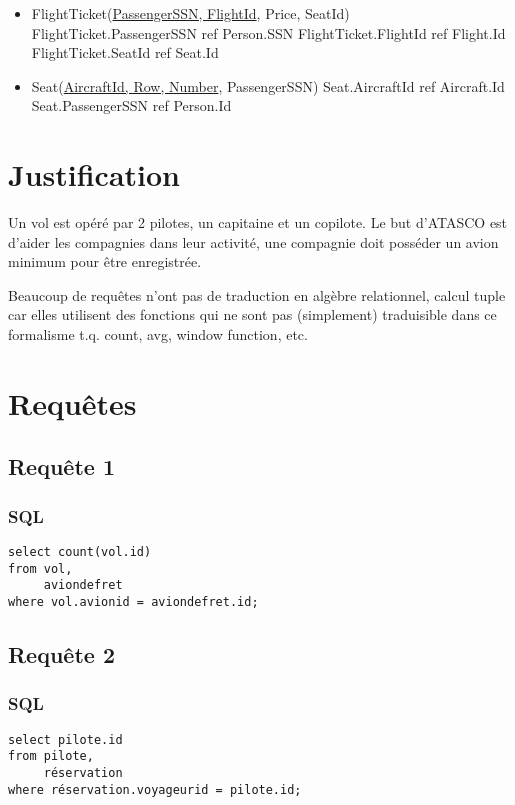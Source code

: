 \documentclass[french, utf8]{article}
\begin{document}
\begin{itemize}
    \item FlightTicket(\underline{PassengerSSN, FlightId}, Price, SeatId)
    \subitem FlightTicket.PassengerSSN ref Person.SSN
    \subitem FlightTicket.FlightId ref Flight.Id
    \subitem FlightTicket.SeatId ref Seat.Id
    \newline

    \item Seat(\underline{AircraftId, Row, Number}, PassengerSSN)
    \subitem Seat.AircraftId ref Aircraft.Id
    \subitem Seat.PassengerSSN ref Person.Id

\end{itemize}




\section{Justification}
Un vol est opéré par 2 pilotes, un capitaine et un copilote.
\newline
Le but d'ATASCO est d'aider les compagnies dans leur activité, une compagnie doit posséder un avion minimum pour être enregistrée.


Beaucoup de requêtes n'ont pas de traduction en algèbre relationnel, calcul tuple car elles utilisent des fonctions qui ne sont pas (simplement) traduisible dans ce formalisme t.q. count, avg, window function, etc.
\newpage

\section{Requêtes}
\subsection{Requête 1}
\subsubsection{SQL}
\begin{verbatim}
select count(vol.id)
from vol,
     aviondefret
where vol.avionid = aviondefret.id;
\end{verbatim}

\newpage

\subsection{Requête 2}

\subsubsection{SQL}
\begin{verbatim}
select pilote.id
from pilote,
     réservation
where réservation.voyageurid = pilote.id;
\end{verbatim}
\end{document}
